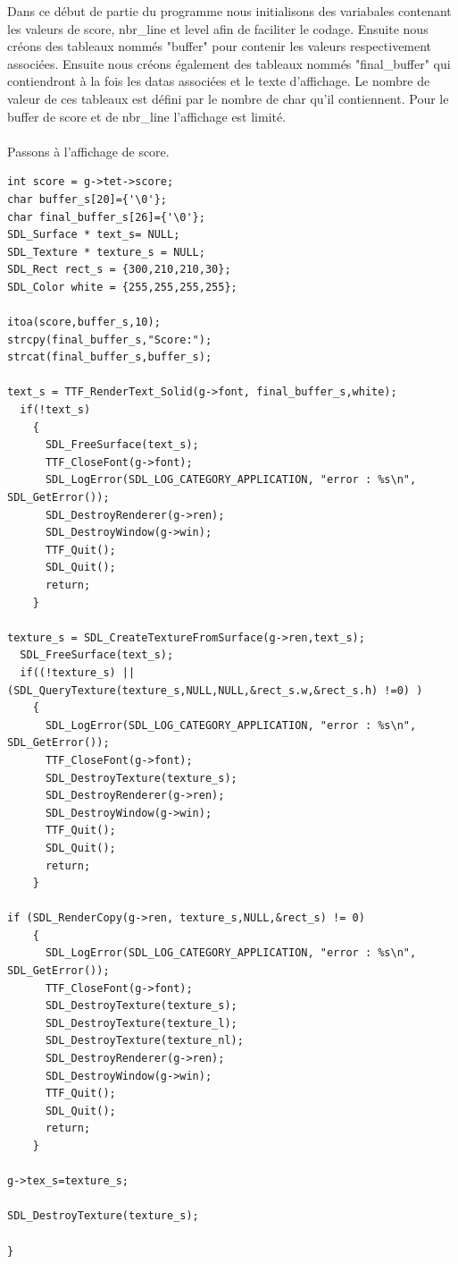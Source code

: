 \documentclass[a4paper,10p]{report}
\begin{document}
Dans ce début de partie du programme nous initialisons des variabales contenant les valeurs de score, nbr\_line et level afin de faciliter le codage. Ensuite nous créons des tableaux nommés "buffer" pour contenir les valeurs respectivement associées. Ensuite nous créons également des tableaux nommés "final\_buffer" qui contiendront à la fois les datas associées et le texte d'affichage. Le nombre de valeur de ces tableaux est défini par le nombre de char qu'il contiennent. Pour le buffer de score et de nbr\_line l'affichage est limité.
\\\\
Passons à l'affichage de score.
\begin{lstlisting}
int score = g->tet->score;
char buffer_s[20]={'\0'};
char final_buffer_s[26]={'\0'};
SDL_Surface * text_s= NULL;
SDL_Texture * texture_s = NULL;
SDL_Rect rect_s = {300,210,210,30};
SDL_Color white = {255,255,255,255};  

itoa(score,buffer_s,10);
strcpy(final_buffer_s,"Score:");
strcat(final_buffer_s,buffer_s);

text_s = TTF_RenderText_Solid(g->font, final_buffer_s,white);
  if(!text_s)
    {
      SDL_FreeSurface(text_s);
      TTF_CloseFont(g->font);
      SDL_LogError(SDL_LOG_CATEGORY_APPLICATION, "error : %s\n", SDL_GetError());
      SDL_DestroyRenderer(g->ren);
      SDL_DestroyWindow(g->win);
      TTF_Quit();
      SDL_Quit();
      return;
    }

texture_s = SDL_CreateTextureFromSurface(g->ren,text_s);
  SDL_FreeSurface(text_s);
  if((!texture_s) || (SDL_QueryTexture(texture_s,NULL,NULL,&rect_s.w,&rect_s.h) !=0) )
    {
      SDL_LogError(SDL_LOG_CATEGORY_APPLICATION, "error : %s\n", SDL_GetError());
      TTF_CloseFont(g->font);
      SDL_DestroyTexture(texture_s);
      SDL_DestroyRenderer(g->ren);
      SDL_DestroyWindow(g->win);
      TTF_Quit();
      SDL_Quit();
      return;
    }

if (SDL_RenderCopy(g->ren, texture_s,NULL,&rect_s) != 0)
    {
      SDL_LogError(SDL_LOG_CATEGORY_APPLICATION, "error : %s\n", SDL_GetError());
      TTF_CloseFont(g->font);
      SDL_DestroyTexture(texture_s);
      SDL_DestroyTexture(texture_l);
      SDL_DestroyTexture(texture_nl);
      SDL_DestroyRenderer(g->ren);
      SDL_DestroyWindow(g->win);
      TTF_Quit();
      SDL_Quit();
      return;
    }

g->tex_s=texture_s;

SDL_DestroyTexture(texture_s);
  
}
\end{lstlisting}
\end{document}
